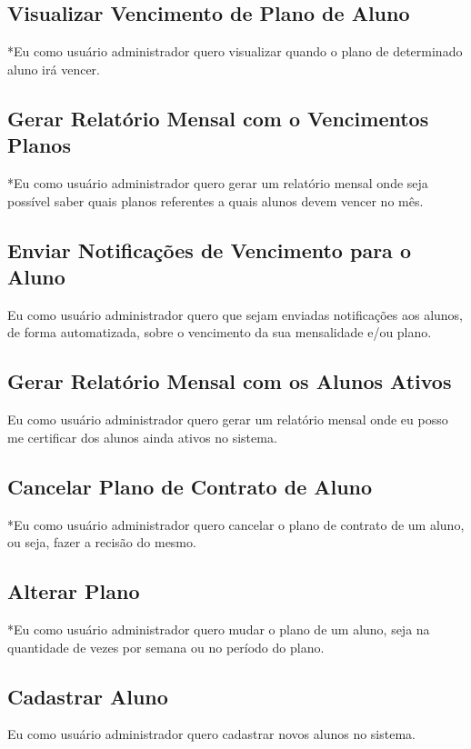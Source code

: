 \subsection[Visualizar Vencimento de Plano de Aluno]{Visualizar Vencimento de Plano de Aluno}
*Eu como usuário administrador quero visualizar quando o plano de determinado
aluno irá vencer.

\subsection[Gerar Relatório Mensal com o Vencimentos Planos]{Gerar Relatório Mensal com o Vencimentos Planos}
*Eu como usuário administrador quero gerar um relatório mensal onde seja possível
saber quais planos referentes a quais alunos devem vencer no mês.

\subsection[Enviar Notificações de Vencimento para o Aluno]{Enviar Notificações de Vencimento para o Aluno}
Eu como usuário administrador quero que sejam enviadas notificações aos alunos,
de forma automatizada, sobre o vencimento da sua mensalidade e/ou plano.

\subsection[Gerar Relatório Mensal com os Alunos Ativos]{Gerar Relatório Mensal com os Alunos Ativos}
Eu como usuário administrador quero gerar um relatório mensal onde eu posso me
certificar dos alunos ainda ativos no sistema.

\subsection[Cancelar Plano de Contrato de Aluno]{Cancelar Plano de Contrato de Aluno}
*Eu como usuário administrador quero cancelar o plano de contrato de um aluno,
 ou seja, fazer a recisão do mesmo.

\subsection[Alterar Plano]{Alterar Plano}
*Eu como usuário administrador quero mudar o plano de um aluno, seja na
quantidade de vezes por semana ou no período do plano.

\subsection[Cadastrar Aluno]{Cadastrar Aluno}
Eu como usuário administrador quero cadastrar novos alunos no sistema.

